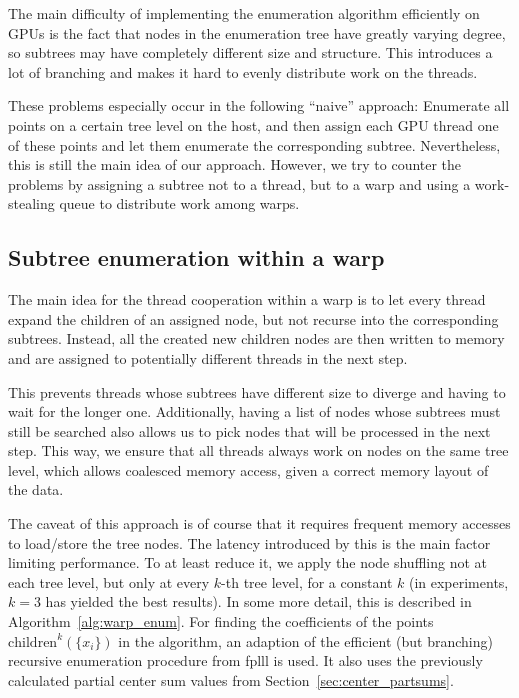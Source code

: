 \documentclass{scrartcl}
\begin{document}
    The main difficulty of implementing the enumeration algorithm efficiently on GPUs is the fact that nodes in the enumeration tree have greatly varying degree, so subtrees may have completely different size and structure. This introduces a lot of branching and makes it hard to evenly distribute work on the threads.

    These problems especially occur in the following ``naive'' approach: Enumerate all points on a certain tree level on the host, and then assign each GPU thread one of these points and let them enumerate the corresponding subtree.
    Nevertheless, this is still the main idea of our approach. However, we try to counter the problems by assigning a subtree not to a thread, but to a warp and using a work-stealing queue to distribute work among warps.

    \subsection{Subtree enumeration within a warp}

    The main idea for the thread cooperation within a warp is to let every thread expand the children of an assigned node, but not recurse into the corresponding subtrees. Instead, all the created new children nodes are then written to memory and are assigned to potentially different threads in the next step.

    This prevents threads whose subtrees have different size to diverge and having to wait for the longer one. Additionally, having a list of nodes whose subtrees must still be searched also allows us to pick nodes that will be processed in the next step. This way, we ensure that all threads always work on nodes on the same tree level, which allows coalesced memory access, given a correct memory layout of the data.

    The caveat of this approach is of course that it requires frequent memory accesses to load/store the tree nodes. The latency introduced by this is the main factor limiting performance. To at least reduce it, we apply the node shuffling not at each tree level, but only at every $k$-th tree level, for a constant $k$ (in experiments, $k = 3$ has yielded the best results).
    In some more detail, this is described in Algorithm~\ref{alg:warp_enum}. For finding the coefficients of the points $\mathrm{children}^k(\{x_i\})$ in the algorithm, an adaption of the efficient (but branching) recursive enumeration procedure from fplll is used. It also uses the previously calculated partial center sum values from Section~\ref{sec:center_partsums}.
\end{document}
